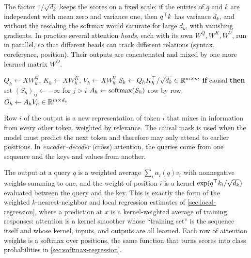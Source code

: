 The factor $1/\sqrt{d_k}$ keeps the scores on a fixed scale: if the entries of $q$ and $k$ are independent with mean zero and variance one, then $q^{\top} k$ has variance $d_k$, and without the rescaling the softmax would saturate for large $d_k$, with vanishing gradients. In practice several attention \emph{heads}, each with its own $W^Q,W^K,W^V$, run in parallel, so that different heads can track different relations (syntax, coreference, position). Their outputs are concatenated and mixed by one more learned matrix $W^O$.

\begin{algorithm}[H]
\caption{Multi-Head Self-Attention (Forward Pass)}\label{alg:attention}
\begin{algorithmic}[1]
  \State $Q_h\gets XW_h^Q$, \quad $K_h\gets XW_h^K$, \quad $V_h\gets XW_h^V$
  \State $S_h\gets Q_hK_h^{\top}/\sqrt{d_k}\in\mathbb{R}^{m\times m}$ 
  \State \textbf{if} causal \textbf{then} set $(S_h)_{ij}\gets-\infty$ for $j>i$ 
  \State $A_h\gets\operatorname{softmax}(S_h)$ row by row; \quad $O_h\gets A_hV_h\in\mathbb{R}^{m\times d_v}$
\EndFor
{}
\end{algorithmic}
\end{algorithm}

Row $i$ of the output is a new representation of token $i$ that mixes in information from every other token, weighted by relevance. The causal mask is used when the model must predict the next token and therefore may only attend to earlier positions. In \emph{encoder--decoder} (cross) attention, the queries come from one sequence and the keys and values from another.

\begin{remark}
The output at a query $q$ is a weighted average $\sum_i\alpha_i(q)v_i$ with nonnegative weights summing to one, and the weight of position $i$ is a kernel $\exp(q^{\top} k_i/\sqrt{d_k})$ evaluated between the query and the key. This is exactly the form of the weighted $k$-nearest-neighbor and local regression estimates of \cref{sec:local-regression}, where a prediction at $x$ is a kernel-weighted average of training responses: attention is a kernel smoother whose ``training set'' is the sequence itself and whose kernel, inputs, and outputs are all learned. Each row of attention weights is a softmax over positions, the same function that turns scores into class probabilities in \cref{sec:softmax-regression}.
\end{remark}

